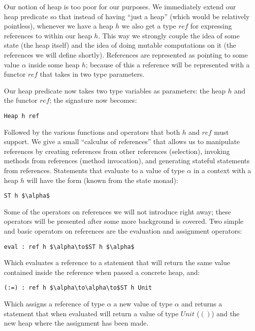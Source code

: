 \documentclass[a4paper]{article}
\begin{document}
 Our notion of heap is too poor for our purposes. We immediately extend our heap predicate so that instead of having ``just a heap'' (which would be relatively pointless), whenever we have a heap $h$ we also get a type $ref$ for expressing references to within our heap $h$. This way we strongly couple the idea of some state (the heap itself) and the idea of doing mutable computations on it (the references we will define shortly). References are represented as pointing to some value $\alpha $ inside some heap $h$; because of this a reference will be represented with a functor $ref$ that takes in two type parameters.

Our heap predicate now takes two type variables as parameters: the heap $h$ and the functor $ref$; the signature now becomes:

\begin{lstlisting}
Heap h ref
\end{lstlisting}

Followed by the various functions and operators that both $h$ and $ref$ must support. We give a small ``calculus of references'' that allows us to manipulate references by creating references from other references (selection), invoking methods from references (method invocation), and generating stateful statements from references. Statements that evaluate to a value of type $\alpha $ in a context with a heap $h$ will have the form (known from the state monad):

\begin{lstlisting}
ST h $\alpha$
\end{lstlisting}

Some of the operators on references we will not introduce right away; these operators will be presented after some more background is covered. Two simple and basic operators on references are the evaluation and assignment operators:

\begin{lstlisting}
eval : ref h $\alpha\to$ST h $\alpha$
\end{lstlisting}

Which evaluates a reference to a statement that will return the same value contained inside the reference when passed a concrete heap, and:

\begin{lstlisting}
(:=) : ref h $\alpha\to\alpha\to$ST h Unit
\end{lstlisting}

Which assigns a reference of type $\alpha $ a new value of type $\alpha $ and returns a statement that when evaluated will return a value of type $Unit$ ($()$) and the new heap where the assignment has been made.
\end{document}

